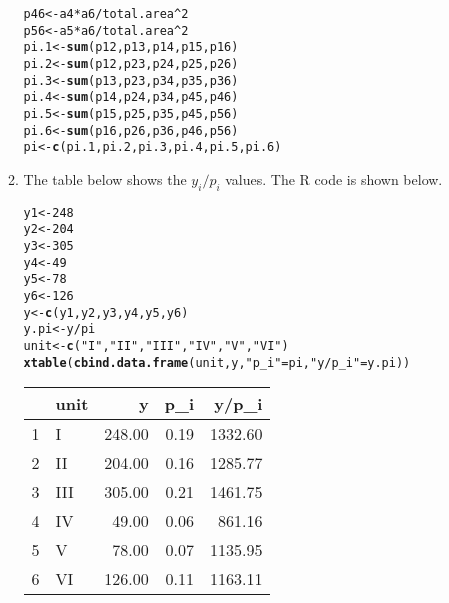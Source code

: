 \documentclass[12pt]{article}\usepackage[]{graphicx}\usepackage[]{color}
\makeatletter
\newcommand{\hlnum}[1]{\textcolor[rgb]{0.686,0.059,0.569}{#1}}%
\newcommand{\hlstr}[1]{\textcolor[rgb]{0.192,0.494,0.8}{#1}}%
\newcommand{\hlopt}[1]{\textcolor[rgb]{0,0,0}{#1}}%
\newcommand{\hlstd}[1]{\textcolor[rgb]{0.345,0.345,0.345}{#1}}%
\newcommand{\hlkwb}[1]{\textcolor[rgb]{0.69,0.353,0.396}{#1}}%
\newcommand{\hlkwd}[1]{\textcolor[rgb]{0.737,0.353,0.396}{\textbf{#1}}}%
\newenvironment{kframe}{%
 \def\at@end@of@kframe{}%
 \ifinner\ifhmode%
  \def\at@end@of@kframe{\end{minipage}}%
  \begin{minipage}{\columnwidth}%
 \fi\fi%
 \def\FrameCommand##1{\hskip\@totalleftmargin \hskip-\fboxsep
 \colorbox{shadecolor}{##1}\hskip-\fboxsep
     \hskip-\linewidth \hskip-\@totalleftmargin \hskip\columnwidth}%
 \MakeFramed {\advance\hsize-\width
   \@totalleftmargin\z@ \linewidth\hsize
   \@setminipage}}%
 {\par\unskip\endMakeFramed%
 \at@end@of@kframe}
\newenvironment{knitrout}{}{} %
\makeatother
\begin{document}
\begin{doublespacing}
\begin{enumerate}
\begin{enumerate}
\begin{singlespace}
\begin{knitrout}
\begin{kframe}
\begin{alltt}
\hlstd{p46} \hlkwb{<-} \hlstd{a4}\hlopt{*}\hlstd{a6}\hlopt{/}\hlstd{total.area}\hlopt{^}\hlnum{2}
\hlstd{p56} \hlkwb{<-} \hlstd{a5}\hlopt{*}\hlstd{a6}\hlopt{/}\hlstd{total.area}\hlopt{^}\hlnum{2}
\hlstd{pi.1} \hlkwb{<-} \hlkwd{sum}\hlstd{(p12, p13, p14, p15, p16)}
\hlstd{pi.2} \hlkwb{<-} \hlkwd{sum}\hlstd{(p12, p23, p24, p25, p26)}
\hlstd{pi.3} \hlkwb{<-} \hlkwd{sum}\hlstd{(p13, p23, p34, p35, p36)}
\hlstd{pi.4} \hlkwb{<-} \hlkwd{sum}\hlstd{(p14, p24, p34, p45, p46)}
\hlstd{pi.5} \hlkwb{<-} \hlkwd{sum}\hlstd{(p15, p25, p35, p45, p56)}
\hlstd{pi.6} \hlkwb{<-} \hlkwd{sum}\hlstd{(p16, p26, p36, p46, p56)}
\hlstd{pi} \hlkwb{<-} \hlkwd{c}\hlstd{(pi.1, pi.2, pi.3, pi.4, pi.5, pi.6)}
\end{alltt}
\end{kframe}
\end{knitrout}
\end{singlespace}

\item The table below shows the $y_i/p_i$ values. The R code is shown below.
\begin{singlespace}
\begin{kframe}
\begin{alltt}
\hlstd{y1} \hlkwb{<-} \hlnum{248}
\hlstd{y2} \hlkwb{<-} \hlnum{204}
\hlstd{y3} \hlkwb{<-} \hlnum{305}
\hlstd{y4} \hlkwb{<-} \hlnum{49}
\hlstd{y5} \hlkwb{<-} \hlnum{78}
\hlstd{y6} \hlkwb{<-} \hlnum{126}
\hlstd{y} \hlkwb{<-} \hlkwd{c}\hlstd{(y1, y2, y3, y4, y5, y6)}
\hlstd{y.pi} \hlkwb{<-} \hlstd{y}\hlopt{/}\hlstd{pi}
\hlstd{unit} \hlkwb{<-} \hlkwd{c}\hlstd{(}\hlstr{"I"}\hlstd{,} \hlstr{"II"}\hlstd{,} \hlstr{"III"}\hlstd{,} \hlstr{"IV"}\hlstd{,} \hlstr{"V"}\hlstd{,} \hlstr{"VI"}\hlstd{)}
\hlkwd{xtable}\hlstd{(}\hlkwd{cbind.data.frame}\hlstd{(unit, y,} \hlstr{"p_i"} \hlstd{= pi,} \hlstr{"y/p_i"} \hlstd{= y.pi))}
\end{alltt}
\end{kframe}%
\begin{table}[ht]
\centering
\begin{tabular}{rlrrr}
  \hline
 & unit & y & p\_i & y/p\_i \\ 
  \hline
1 & I & 248.00 & 0.19 & 1332.60 \\ 
  2 & II & 204.00 & 0.16 & 1285.77 \\ 
  3 & III & 305.00 & 0.21 & 1461.75 \\ 
  4 & IV & 49.00 & 0.06 & 861.16 \\ 
  5 & V & 78.00 & 0.07 & 1135.95 \\ 
  6 & VI & 126.00 & 0.11 & 1163.11 \\ 
   \hline
\end{tabular}
\end{table}


\end{singlespace}
\end{enumerate}
\end{enumerate}
\end{doublespacing}
\end{document}
